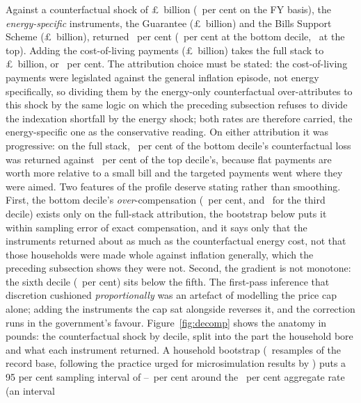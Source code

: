 Against a counterfactual shock of \pounds\SsCounterAggBn\ billion
(\SsCounterRisePct\ per cent on the FY basis), the
\emph{energy-specific} instruments, the Guarantee
(\pounds\SsEpgBn\ billion) and the Bills Support Scheme
(\pounds\SsEbssBn\ billion), returned \SsGridPaperEbssRatePct\ per
cent (\SsGridPaperEbssDOne\ per cent at the bottom decile,
\SsGridPaperEbssDTen\ at the top). Adding the cost-of-living payments
(\pounds\SsColBn\ billion) takes the full stack to
\pounds\SsDiscretionaryBn\ billion, or \SsDiscretionaryRatePct\ per
cent. The attribution choice must be stated: the cost-of-living
payments were legislated against the general inflation episode, not
energy specifically, so dividing them by the energy-only
counterfactual over-attributes to this shock by the same logic on
which the preceding subsection refuses to divide the indexation
shortfall by the energy shock; both rates are therefore carried, the
energy-specific one as the conservative reading. On either attribution it was progressive: on the full stack,
\SsCushionPctDecOne\ per cent of the bottom decile's counterfactual
loss was returned against \SsCushionPctDecTen\ per cent of the top
decile's, because flat payments are worth more relative to a small
bill and the targeted payments went where they were aimed. Two
features of the profile deserve stating rather than smoothing. First,
the bottom decile's \emph{over}-compensation (\SsCushionPctDecOne\
per cent, and \SsCushionPctDecThree\ for the third decile) exists
only on the full-stack attribution, the bootstrap below puts it
within sampling error of exact compensation, and it says only that
the instruments returned about as much as the counterfactual energy
cost, not that those households were made whole against inflation
generally, which the preceding subsection shows they were not.
Second, the gradient is not monotone: the sixth decile
(\SsCushionPctDecSix\ per cent) sits below the fifth. The
first-pass inference that discretion cushioned \emph{proportionally}
was an artefact of modelling the price cap alone; adding the
instruments the cap sat alongside reverses it, and the correction runs
in the government's favour. Figure~\ref{fig:decomp} shows the anatomy in
pounds: the counterfactual shock by decile, split into the part the
household bore and what each instrument returned. A household bootstrap
(\SsBootReps\ resamples of the record base, following the practice
urged for microsimulation results by \citet{goedeme2013}) puts a 95 per cent
sampling interval of \SsRateLo--\SsRateHi\ per cent around the
\SsDiscretionaryRatePct\ per cent aggregate rate (an interval
